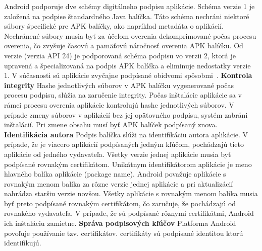 Android podporuje dve schémy digitálneho podpisu aplikácie. Schéma verzie 1 je založená na podpise štandardného Java balíčka. Táto schéma nechráni niektoré súbory špecifické pre APK balíčky, ako napríklad metadáta o aplikácií. Nechránené súbory musia byť za účelom overenia dekomprimované počas procesu overenia, čo zvyšuje časovú a pamäťovú náročnosť overenia APK balíčku.  Od verzie  (verzia API 24) je podporovaná schéma podpisu vo verzii 2, ktorá je upravená a špecializovaná na podpis APK balíčka a eliminuje nedostatky verzie 1. V súčasnosti sú aplikácie zvyčajne podpísané obidvomi spôsobmi~\cite{NT0FrzQIkOAYbG2Ga}.
\newline \newline
\noindent \textbf{Kontrola integrity} \newline \newline
\noindent Hashe jednotlivých súborov v APK balíčku vygenerované počas procesu podpisu, slúžia na zaručenie integrity. Počas inštalácie aplikácie sa v rámci procesu overenia aplikácie kontrolujú hashe jednotlivých súborov. V prípade zmeny súborov v aplikácií bez jej opätovného podpisu, systém zabráni inštalácií. Pri zmene obsahu musí byť APK balíček podpísaný znova. 
\newline \newline
\noindent \textbf{Identifikácia autora} \newline \newline
\noindent Podpis balíčka slúži na identifikáciu autora aplikácie. V prípade, že je viacero aplikácií podpísaných jedným kľúčom, pochádzajú tieto aplikácie od jedného vydavateľa. 
Všetky verzie jednej aplikácie musia byť podpísané rovnakým certifikátom. Unikátnym identifikátorom aplikácie je meno hlavného balíka aplikácie (package name). Android považuje aplikácie s rovnakým menom balíka za rôzne verzie jednej aplikácie a pri aktualizácií nahrádza staršiu verzie novšou. Všetky aplikácie s rovnakým menom balíka musia byť preto podpísané rovnakým certifikátom, čo zaručuje, že pochádzajú od rovnakého vydavateľa.  V prípade, že sú podpísané rôznymi certifikátmi, Android ich inštaláciu zamietne. 
\newline \newline
\noindent \textbf{Správa podpisových kľúčov} \newline \newline
\noindent Platforma Android povoľuje používanie tzv.  certifikátov.  certifikáty sú podpísané identitou ktorú identifikujú. 

